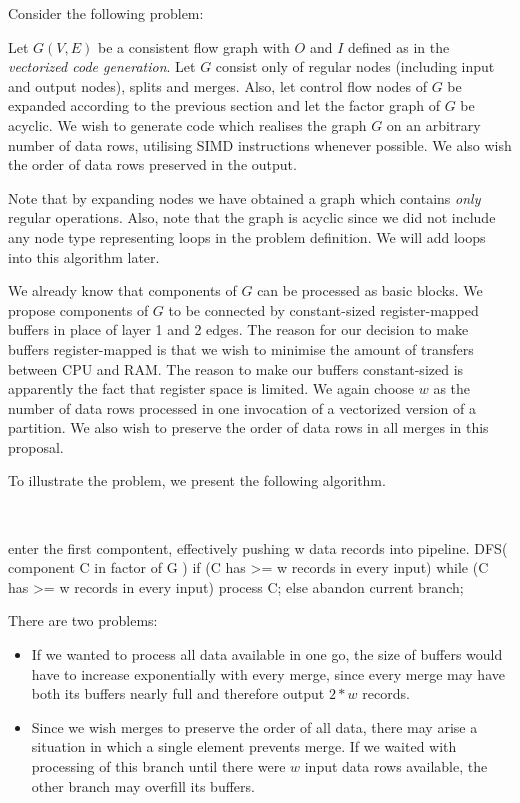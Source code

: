 Consider the following problem:

  Let $G(V,E)$ be a consistent flow graph with $O$ and $I$ defined as in the \emph{vectorized code generation}. Let $G$ consist only of regular nodes (including input and output nodes), splits and merges.  Also, let control flow nodes of $G$ be expanded according to the previous section and let the factor graph of $G$ be acyclic. We wish to generate code which realises the graph $G$ on an arbitrary number of data rows, utilising SIMD instructions whenever possible. We also wish the order of data rows preserved in the output.
\myendprob

\begin{rem} 
Note that by expanding nodes we have obtained a graph which contains \emph{only} regular operations. Also, note that the graph is acyclic since we did not include any node type representing loops in the problem definition. We will add loops into this algorithm later.
\end{rem}

We already know that components of $G$ can be processed as basic blocks. We propose components of $G$ to be connected by constant-sized register-mapped buffers in place of layer 1 and 2 edges. The reason for our decision to make buffers register-mapped is that we wish to minimise the amount of transfers between CPU and RAM. The reason to make our buffers constant-sized is apparently the fact that register space is limited. We again choose $w$ as the number of data rows processed in one invocation of a vectorized version of a partition. We also wish to preserve the order of data rows in all merges in this proposal.


To illustrate the problem, we present the following algorithm.

 \ 
\begin{code}
enter the first compontent, 
  effectively pushing w data records into pipeline.
DFS( component C in factor of G )
{
  if (C has >= w records in every input)
    while (C has >= w records in every input)
      process C;
  else
    abandon current branch;
}
\end{code}
\myendalg

There are two problems:

\begin{itemize}
  \item If we wanted to process all data available in one go, the size of buffers would have to increase exponentially with every merge, since every merge may have both its buffers nearly full and therefore output $2*w$ records.
  \item Since we wish merges to preserve the order of all data, there may arise a situation in which a single element prevents merge. If we waited with processing of this branch until there were $w$ input data rows available, the other branch may overfill its buffers.
\end{itemize}

